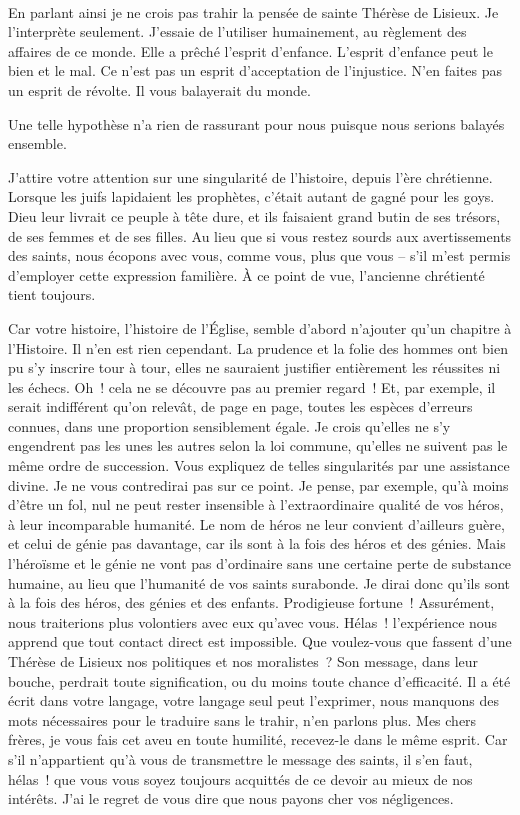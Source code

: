 \documentclass[french,twoside]{book} %
\newcommand{\astertri}{\medskip\par\centerline{\color{rubric}\large\selectfont{\syms ✻\,✻\,✻}}\medskip\par}%
\begin{document}
\astertri

\noindent  \par
En parlant ainsi je ne crois pas trahir la pensée de sainte Thérèse de Lisieux. Je l’interprète seulement. J’essaie de l’utiliser humainement, au règlement des affaires de ce monde. Elle a prêché l’esprit d’enfance. L’esprit d’enfance peut le bien et le mal. Ce n’est pas un esprit d’acceptation de l’injustice. N’en faites pas un esprit de révolte. Il vous balayerait du monde.\par
Une telle hypothèse n’a rien de rassurant pour nous puisque nous serions balayés ensemble.\par
J’attire votre attention sur une singularité de l’histoire, depuis l’ère chrétienne. Lorsque les juifs lapidaient les prophètes, c’était autant de gagné pour les goys. Dieu leur livrait ce peuple à tête dure, et ils faisaient grand butin de ses trésors, de ses femmes et de ses filles. Au lieu que si vous restez sourds aux avertissements des saints, nous écopons avec vous, comme vous, plus que vous – s’il m’est permis d’employer cette expression familière. À ce point de vue, l’ancienne chrétienté tient toujours.\par
Car votre histoire, l’histoire de l’Église, semble d’abord n’ajouter qu’un chapitre à l’Histoire. Il n’en est rien cependant. La prudence et la folie des hommes ont bien pu s’y inscrire tour à tour, elles ne sauraient justifier entièrement les réussites ni les échecs. Oh ! cela ne se découvre pas au premier regard ! Et, par exemple, il serait indifférent qu’on relevât, de page en page, toutes les espèces d’erreurs connues, dans une proportion sensiblement égale. Je crois qu’elles ne s’y engendrent pas les unes les autres selon la loi commune, qu’elles ne suivent pas le même ordre de succession. Vous expliquez de telles singularités par une assistance divine. Je ne vous contredirai pas sur ce point. Je pense, par exemple, qu’à moins d’être un fol, nul ne peut rester insensible à l’extraordinaire qualité de vos héros, à leur incomparable humanité. Le nom de héros ne leur convient d’ailleurs guère, et celui de génie pas davantage, car ils sont à la fois des héros et des génies. Mais l’héroïsme et le génie ne vont pas d’ordinaire sans une certaine perte de substance humaine, au lieu que l’humanité de vos saints surabonde. Je dirai donc qu’ils sont à la fois des héros, des génies et des enfants. Prodigieuse fortune ! Assurément, nous traiterions plus volontiers avec eux qu’avec vous. Hélas ! l’expérience nous apprend que tout contact direct est impossible. Que voulez-vous que fassent d’une Thérèse de Lisieux nos politiques et nos moralistes ? Son message, dans leur bouche, perdrait toute signification, ou du moins toute chance d’efficacité. Il a été écrit dans votre langage, votre langage seul peut l’exprimer, nous manquons des mots nécessaires pour le traduire sans le trahir, n’en parlons plus. Mes chers frères, je vous fais cet aveu en toute humilité, recevez-le dans le même esprit. Car s’il n’appartient qu’à vous de transmettre le message des saints, il s’en faut, hélas ! que vous vous soyez toujours acquittés de ce devoir au mieux de nos intérêts. J’ai le regret de vous dire que nous payons cher vos négligences.\par
\end{document}
